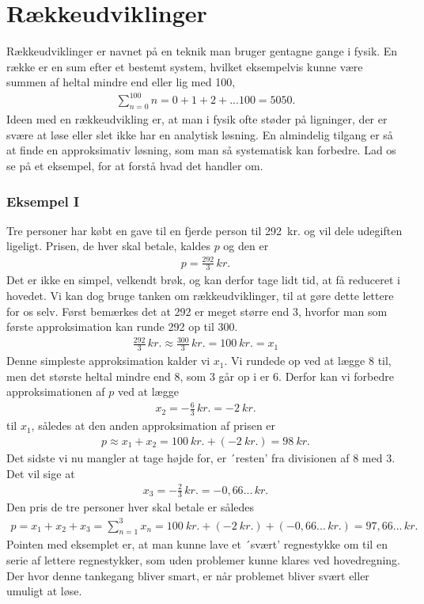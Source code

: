 \section{Rækkeudviklinger} \label{mat:sec:raekker}
Rækkeudviklinger er navnet på en teknik man bruger gentagne gange i fysik. En række er en sum efter et bestemt system, hvilket eksempelvis kunne være summen af heltal mindre end eller lig med 100,
%
\begin{align}
    \sum_{n=0}^{100}n = 0 + 1 + 2 + ... 100 = 5050.
\end{align}
%
Ideen med en rækkeudvikling er, at man i fysik ofte støder på ligninger, der er svære at løse eller slet ikke har en analytisk løsning. En almindelig tilgang er så at finde en approksimativ løsning, som man så systematisk kan forbedre. Lad os se på et eksempel, for at forstå hvad det handler om.

\subsubsection{Eksempel I}
Tre personer har købt en gave til en fjerde person til \SI{292}{kr}. og vil dele udegiften ligeligt. Prisen, de hver skal betale, kaldes $p$ og den er
%
\begin{align}
    p = \frac{292}{3}\,\si{kr}.
\end{align}
%
Det er ikke en simpel, velkendt brøk, og kan derfor tage lidt tid, at få reduceret i hovedet. Vi kan dog bruge tanken om rækkeudviklinger, til at gøre dette lettere for os selv. Først bemærkes det at 292 er meget større end 3, hvorfor man som første approksimation kan runde 292 op til 300.
%
\begin{align}
    \frac{292}{3}\,\si{kr}. \approx \frac{300}{3}\,\si{kr}. = \SI{100}{kr}. = x_1
\end{align}
%
Denne simpleste approksimation kalder vi $x_1$. Vi rundede op ved at lægge 8 til, men det største heltal mindre end 8, som 3 går op i er 6. Derfor kan vi forbedre approksimationen af $p$ ved at lægge
%
\begin{align}
    x_2 = -\frac{6}{3}\,\si{kr}. = -\SI{2}{kr}.
\end{align}
%
til $x_1$, således at den anden approksimation af prisen er
%
\begin{align}
    p \approx x_1 + x_2 = \SI{100}{kr}. + \left(-\SI{2}{kr}.\right) = \SI{98}{kr}.
\end{align}
%
Det sidste vi nu mangler at tage højde for, er ´resten' fra divisionen af 8 med 3. Det vil sige at
%
\begin{align}
    x_3 = -\frac{2}{3}\,\si{kr}. = -0,66...\,\si{kr}.
\end{align}
%
Den pris de tre personer hver skal betale er således
%
\begin{align}
    p = x_1 + x_2 + x_3 = \sum_{n=1}^3 x_n = \SI{100}{kr}. + \left(-\SI{2}{kr}.\right) + \left(-0,66...\,\si{kr}.\right) = 97,66...\,\si{kr}.
\end{align}
%
Pointen med eksemplet er, at man kunne lave et ´svært' regnestykke om til en serie af lettere regnestykker, som uden problemer kunne klares ved hovedregning. Der hvor denne tankegang bliver smart, er når problemet bliver svært eller umuligt at løse.

